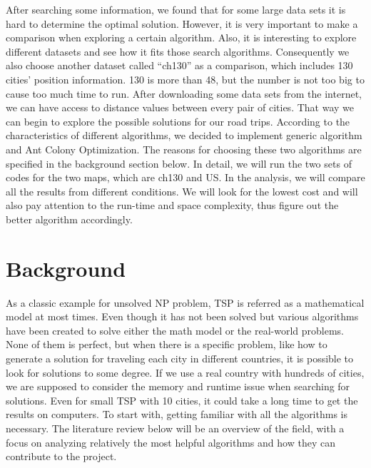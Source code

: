 \documentclass{article}
\begin{document}
After searching some information, we found that for some large data sets it is hard to determine the optimal solution\cite{10.1007/978-3-642-13800-3_29}. However, it is very important to make a comparison when exploring a certain algorithm. Also, it is interesting to explore different datasets and see how it fits those search algorithms. Consequently we also choose another dataset called “ch130” as a comparison, which includes 130 cities’ position information. 130 is more than 48, but the number is not too big to cause too much time to run. 
After downloading some data sets from the internet, we can have access to distance values between every pair of cities. That way we can begin to explore the possible solutions for our road trips. 
According to the characteristics of different algorithms, we decided to implement generic algorithm and Ant Colony Optimization\citep{LiJ.2018APSA}. The reasons for choosing these two algorithms are specified in the background section below. In detail, we will run the two sets of codes for the two maps, which are ch130 and US. In the analysis, we will compare all the results from different conditions. We will look for the lowest cost and will also pay attention to the run-time and space complexity, thus figure out the better algorithm accordingly. 

\section{Background} 
As a classic example for unsolved NP problem, TSP is referred as a mathematical model at most times. Even though it has not been solved but various algorithms have been created to solve either the math model or the real-world problems. None of them is perfect, but when there is a specific problem, like how to generate a solution for traveling each city in different countries, it is possible to look for solutions to some degree. If we use a real country with hundreds of cities, we are supposed to consider the memory and runtime issue when searching for solutions. Even for small TSP with 10 cities, it could take a long time to get the results on computers. To start with, getting familiar with all the algorithms is necessary. The literature review below will be an overview of the field, with a focus on analyzing relatively the most helpful algorithms and how they can contribute to the project.
\end{document}
